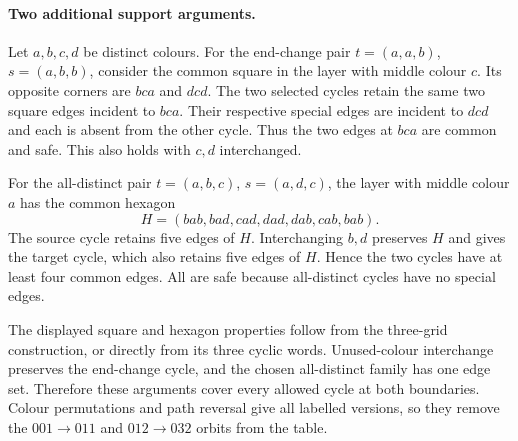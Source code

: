 \paragraph{Two additional support arguments.}
Let $a,b,c,d$ be distinct colours. For the end-change pair
$t=(a,a,b)$, $s=(a,b,b)$, consider the common square in the layer
with middle colour $c$. Its opposite corners are $bca$ and $dcd$.
The two selected cycles retain the same two square edges incident
to $bca$. Their respective special edges are incident to $dcd$
and each is absent from the other cycle. Thus the two edges at
$bca$ are common and safe. This also holds with $c,d$ interchanged.

For the all-distinct pair $t=(a,b,c)$, $s=(a,d,c)$, the layer with
middle colour $a$ has the common hexagon
\[
H=(bab,bad,cad,dad,dab,cab,bab).
\]
The source cycle retains five edges of $H$. Interchanging $b,d$
preserves $H$ and gives the target cycle, which also retains five
edges of $H$. Hence the two cycles have at least four common edges.
All are safe because all-distinct cycles have no special edges.

The displayed square and hexagon properties follow from the
three-grid construction, or directly from its three cyclic words.
Unused-colour interchange preserves the end-change cycle, and the
chosen all-distinct family has one edge set. Therefore these
arguments cover every allowed cycle at both boundaries. Colour
permutations and path reversal give all labelled versions, so they
remove the $001\to011$ and $012\to032$ orbits from the table.


